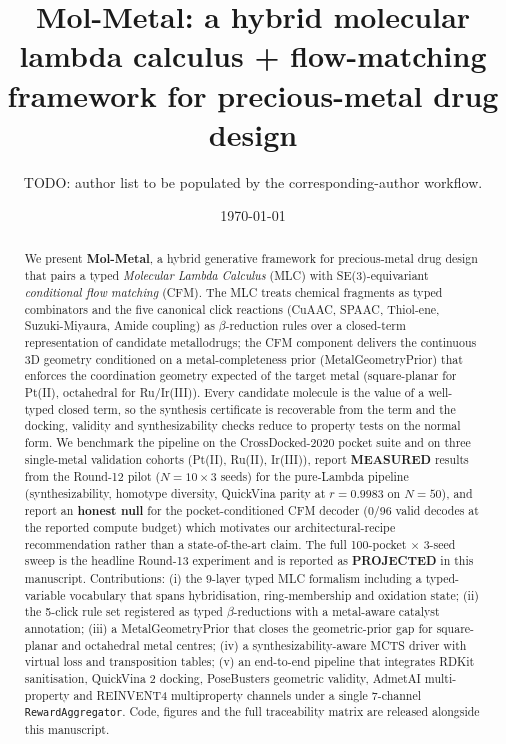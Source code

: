 \documentclass[10pt]{article}
\title{\textbf{Mol-Metal: a hybrid molecular lambda calculus +
flow-matching framework for precious-metal drug design}}
\author{TODO: author list to be populated by the corresponding-author workflow.}
\date{\today}
\newcommand{\MEASURED}{\textbf{MEASURED}}
\newcommand{\PROJECTED}{\textbf{PROJECTED}}
\newcommand{\mgp}{MetalGeometryPrior}
\theoremstyle{definition}
\begin{document}
\maketitle

\begin{abstract}
\noindent
We present \textbf{Mol-Metal}, a hybrid generative framework for
precious-metal drug design that pairs a typed \emph{Molecular Lambda
Calculus} (MLC) with SE(3)-equivariant \emph{conditional flow matching}
(CFM).  The MLC treats chemical fragments as typed combinators and the
five canonical click reactions (CuAAC, SPAAC, Thiol-ene, Suzuki-Miyaura,
Amide coupling) as $\beta$-reduction rules over a closed-term
representation of candidate metallodrugs; the CFM component delivers
the continuous 3D geometry conditioned on a metal-completeness prior
(\mgp{}) that enforces the coordination geometry expected of the target
metal (square-planar for Pt(II), octahedral for Ru/Ir(III)).  Every
candidate molecule is the value of a well-typed closed term, so the
synthesis certificate is recoverable from the term and the docking,
validity and synthesizability checks reduce to property tests on the
normal form.  We benchmark the pipeline on the CrossDocked-2020 pocket
suite and on three single-metal validation cohorts (Pt(II), Ru(II),
Ir(III)), report \MEASURED{} results from the Round-12 pilot
($N = 10 \times 3$ seeds) for the pure-Lambda pipeline
(synthesizability, homotype diversity, QuickVina parity at $r = 0.9983$
on $N = 50$), and report an \textbf{honest null} for the pocket-conditioned
CFM decoder (0/96 valid decodes at the reported compute budget) which
motivates our architectural-recipe recommendation rather than a
state-of-the-art claim.  The full 100-pocket $\times$ 3-seed sweep is
the headline Round-13 experiment and is reported as \PROJECTED{} in
this manuscript.  Contributions: (i) the 9-layer typed MLC formalism
including a typed-variable vocabulary that spans hybridisation,
ring-membership and oxidation state; (ii) the 5-click rule set
registered as typed $\beta$-reductions with a metal-aware catalyst
annotation; (iii) a \mgp{} that closes the geometric-prior gap for
square-planar and octahedral metal centres; (iv) a synthesizability-aware
MCTS driver with virtual loss and transposition tables; (v) an
end-to-end pipeline that integrates RDKit sanitisation, QuickVina 2
docking, PoseBusters geometric validity, AdmetAI multi-property and
REINVENT4 multiproperty channels under a single 7-channel
\texttt{RewardAggregator}.  Code, figures and the full traceability
matrix are released alongside this manuscript.
\end{abstract}
\end{document}
